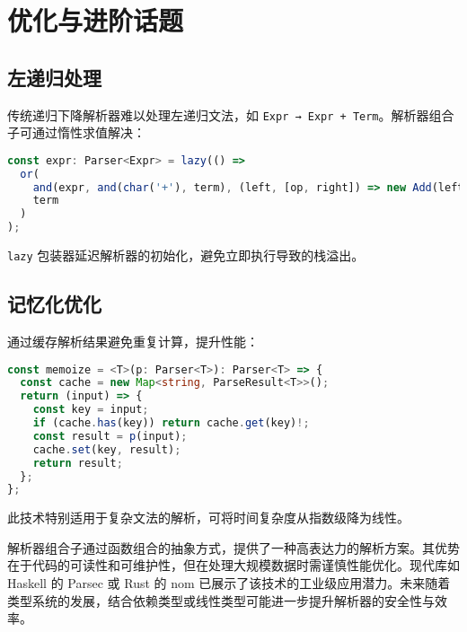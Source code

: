 \chapter{优化与进阶话题}
\section{左递归处理}
传统递归下降解析器难以处理左递归文法，如 \verb!Expr → Expr + Term!。解析器组合子可通过惰性求值解决：\par
\begin{lstlisting}[language=typescript]
const expr: Parser<Expr> = lazy(() =>
  or(
    and(expr, and(char('+'), term), (left, [op, right]) => new Add(left, right)),
    term
  )
);
\end{lstlisting}
\verb!lazy! 包装器延迟解析器的初始化，避免立即执行导致的栈溢出。\par
\section{记忆化优化}
通过缓存解析结果避免重复计算，提升性能：\par
\begin{lstlisting}[language=typescript]
const memoize = <T>(p: Parser<T>): Parser<T> => {
  const cache = new Map<string, ParseResult<T>>();
  return (input) => {
    const key = input;
    if (cache.has(key)) return cache.get(key)!;
    const result = p(input);
    cache.set(key, result);
    return result;
  };
};
\end{lstlisting}
此技术特别适用于复杂文法的解析，可将时间复杂度从指数级降为线性。\par
解析器组合子通过函数组合的抽象方式，提供了一种高表达力的解析方案。其优势在于代码的可读性和可维护性，但在处理大规模数据时需谨慎性能优化。现代库如 Haskell 的 Parsec 或 Rust 的 nom 已展示了该技术的工业级应用潜力。未来随着类型系统的发展，结合依赖类型或线性类型可能进一步提升解析器的安全性与效率。\par
